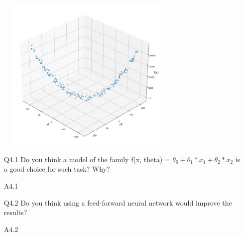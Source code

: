 \documentclass[11pt]{scrartcl}
\begin{document}
\begin{figure}[htbp] %
    \centering
    \includegraphics[width=0.7\textwidth]{../parabolic.jpg}
\end{figure}

\begin{itemize}
\item[Q4.1] Do you think a model of the family f(x, theta) = $\theta_0 + \theta_1 * x_1 + \theta_2 * x_2$ is a good choice for such task? Why?

\item [A4.1]

\item[Q4.2] Do you think using a feed-forward neural network would improve the results?

\item[A4.2]

\end{itemize}
\end{document}
